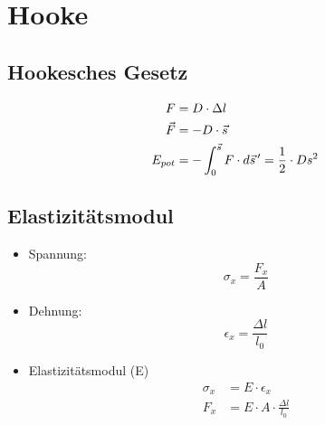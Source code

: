 \documentclass[10pt,a4paper]{article}
\begin{document}
\section{Hooke}
\subsection{Hookesches Gesetz}
\begin{align}
F &=D \cdot \Delta l \\
\vec F &=-D\cdot \vec s \\
E_{pot} &=-\int^{\vec s}_{0} F \cdot d\vec s \hspace{0,05cm}'=\frac{1}{2} \cdot D s^2
\end{align}
\subsection{Elastizitätsmodul}
\begin{itemize}
\item Spannung:
\begin{equation}
\sigma_x = \frac{F_x}{A}
\end{equation}
\item Dehnung:
\begin{equation}
\epsilon_x=\frac{\Delta l}{l_0}
\end{equation}
\item Elastizitätsmodul (E)
\begin{align}
\sigma_x &=E \cdot \epsilon_x \\
F_x &=E \cdot A \cdot \frac{\Delta l}{l_0}
\end{align}
\end{itemize}
\end{document}
